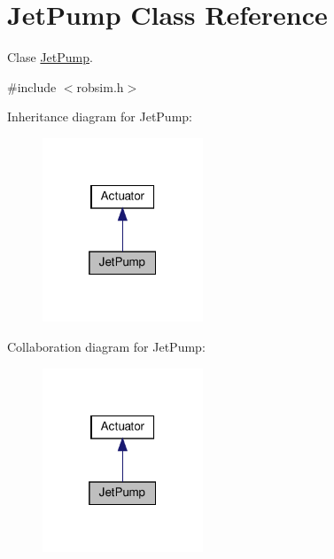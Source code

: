 \hypertarget{classJetPump}{}\section{Jet\+Pump Class Reference}
\label{classJetPump}


Clase \hyperlink{classJetPump}{Jet\+Pump}.  




{\ttfamily \#include $<$robsim.\+h$>$}



Inheritance diagram for Jet\+Pump\+:\nopagebreak
\begin{figure}[H]
\begin{center}
\leavevmode
\includegraphics[width=136pt]{classJetPump__inherit__graph}
\end{center}
\end{figure}


Collaboration diagram for Jet\+Pump\+:\nopagebreak
\begin{figure}[H]
\begin{center}
\leavevmode
\includegraphics[width=136pt]{classJetPump__coll__graph}
\end{center}
\end{figure}
